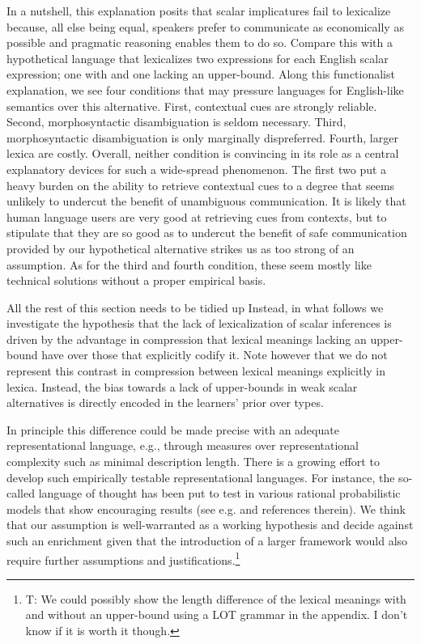 \documentclass[a4paper]{article}
\newcommand{\hl}[1]{\textcolor[rgb]{.8,.33,.0}{#1}}%
\begin{document}
In a nutshell, this explanation posits that scalar implicatures fail to lexicalize because, all else being equal, speakers prefer to communicate as economically as possible and pragmatic reasoning enables them to do so. Compare this with a hypothetical language that lexicalizes two expressions for each English scalar expression; one with and one lacking an upper-bound. Along this functionalist explanation, we see four conditions that may pressure languages for English-like semantics over this alternative. First, contextual cues are strongly reliable. Second, morphosyntactic disambiguation is seldom necessary. Third, morphosyntactic disambiguation is only marginally dispreferred. Fourth, larger lexica are costly. Overall, neither condition is convincing in its role as a central explanatory devices for such a wide-spread phenomenon. The first two put a heavy burden on the ability to retrieve contextual cues to a degree that seems unlikely to undercut the benefit of unambiguous communication. It is likely that human language users are very good at retrieving cues from contexts, but to stipulate that they are so good as to undercut the benefit of safe communication provided by our hypothetical alternative strikes us as too strong of an assumption.  As for the third and fourth condition, these seem mostly like technical solutions without a proper empirical basis. 

\hl{All the rest of this section needs to be tidied up} Instead, in what follows we investigate the hypothesis that the lack of lexicalization of scalar inferences is driven by the advantage in compression that lexical meanings lacking an upper-bound have over those that explicitly codify it. Note however that we do not represent this contrast in compression between lexical meanings explicitly in lexica. Instead, the bias towards a lack of upper-bounds in weak scalar alternatives is directly encoded in the learners' prior over types.

 In principle this difference could be made precise with an adequate representational language, e.g., through measures over representational complexity such as minimal description length.  There is a growing effort to develop such empirically  testable  representational  languages. For  instance, the so-called language of thought has been put to test in various rational probabilistic models that show encouraging results (see e.g. \citealt{katz+etal:2008, piantadosi+etal:underreview, piantadosi+etal:2012} and references therein). We think that our assumption is well-warranted as a working hypothesis and decide against such an enrichment given that the introduction of a larger framework would also require further assumptions and justifications.\footnote{\hl{T: We could possibly show the length difference of the lexical meanings with and without an upper-bound using a LOT grammar in the appendix. I don't know if it is worth it though.}}
\end{document}
